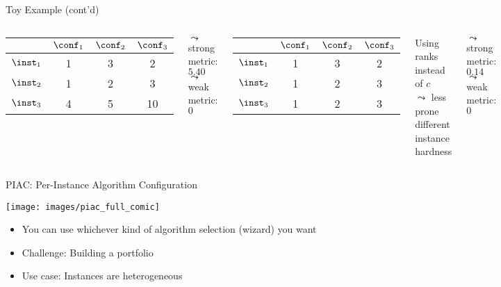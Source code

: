 \begin{frame}[c]{Toy Example (cont'd)}

\begin{columns}

\begin{center}
\begin{tabular}{l|ccc}
& $\conf_1$ & $\conf_2$ & $\conf_3$\\
\midrule
$\inst_1$ & 1 & 3 & 2 \\
$\inst_2$ & 1 & 2 & 3 \\
$\inst_3$ & 4 & 5 & 10 \\ 
\end{tabular}
\end{center}

\bigskip
\pause
$\leadsto$ strong metric: $5.40$ \\
$\leadsto$ weak metric: $0$ 

\pause
{}
\begin{center}
\begin{tabular}{l|ccc}
& $\conf_1$ & $\conf_2$ & $\conf_3$\\
\midrule
$\inst_1$ & 1 & 3 & 2 \\
$\inst_2$ & 1 & 2 & 3 \\
$\inst_3$ & 1 & 2 & 3 \\ 
\end{tabular}
\end{center}

\bigskip
Using ranks instead of $c$\\
$\leadsto$ less prone different instance hardness

\bigskip
\pause
$\leadsto$ strong metric: $0.14$\\
$\leadsto$ weak metric: $0$\\

\end{columns}

\end{frame}
\begin{frame}[c]{PIAC: Per-Instance Algorithm Configuration}

\texttt{[image: images/piac\_full\_comic]}

\bigskip

\begin{itemize}
  \item You can use whichever kind of algorithm selection (wizard) you want
  \item \alert{Challenge:} Building a portfolio
  \item \alert{Use case:} Instances are heterogeneous
\end{itemize}

\end{frame}
